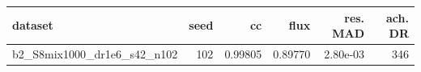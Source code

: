 \begin{tabular}{lrrrrr}
\toprule
dataset & seed & cc & flux & res. MAD & ach. DR \\
\midrule
b2\_S8mix1000\_dr1e6\_s42\_n102 & 102 & 0.99805 & 0.89770 & 2.80e-03 & 346 \\
\bottomrule
\end{tabular}